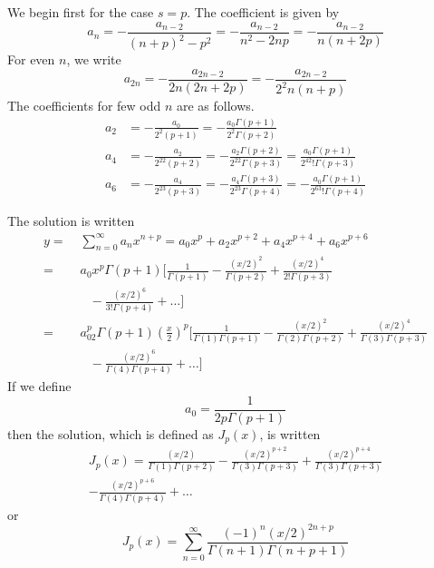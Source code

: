 \documentclass[../main.tex]{subfiles}
\begin{document}
We begin first for the case $s=p$. The coefficient is given by 
\begin{equation*}
    a_n=-\frac{a_{n-2}}{(n+p)^2-p^2}=-\frac{a_{n-2}}{n^2-2np}=-\frac{a_{n-2}}{n(n+2p)}
\end{equation*}
For even $n$, we write
\begin{equation*}
    a_{2n}=-\frac{a_{2n-2}}{2n(2n+2p)}= -\frac{a_{2n-2}}{2^2n(n+p)}
\end{equation*}
The coefficients for few odd $n$ are as follows.
\begin{align*}
    a_2&=-\frac{a_0}{2^2(p+1)}=-\frac{a_0\Gamma(p+1)}{2^2\Gamma(p+2)}\\
    a_4&=-\frac{a_2}{2^22(p+2)}=-\frac{a_2\Gamma(p+2)}{2^22\Gamma(p+3)}=\frac{a_0\Gamma(p+1)}{2^42!\Gamma(p+3)}\\
    a_6&=-\frac{a_4}{2^23(p+3)}=-\frac{a_4\Gamma(p+3)}{2^23\Gamma(p+4)}=-\frac{a_0\Gamma(p+1)}{2^63!\Gamma(p+4)}
\end{align*}

The solution is written
\begin{align*}    
    y=&\;\sum_{n=0}^{\infty} a_nx^{n+p}=a_0x^p+a_2x^{p+2}+a_4 x^{p+4}+a_6x^{p+6}\\
    =&\;a_0x^p\Gamma(p+1)\bigg[\frac{1}{\Gamma(p+1)}- \frac{(x/2)^2}{\Gamma(p+2)}+\frac{(x/2)^4}{2!\Gamma(p+3)}\\
    &\quad- \frac{(x/2)^6}{3!\Gamma(p+4)}+\dots\bigg]\\
    =&\;a_02^p\Gamma(p+1)\left(\frac{x}{2}\right)^p\bigg[\frac{1}{\Gamma(1)\Gamma(p+1)}- \frac{(x/2)^2}{\Gamma(2)\Gamma(p+2)}+\frac{(x/2)^4}{\Gamma(3)\Gamma(p+3)}\\
    &\quad- \frac{(x/2)^6}{\Gamma(4)\Gamma(p+4)}+\dots\bigg]
\end{align*}
If we define 
\begin{equation*}
    a_0=\frac{1}{2p\Gamma(p+1)}
\end{equation*}
then the solution, which is defined as $J_p(x)$, is written
\begin{multline*}
    J_p(x)=\frac{(x/2)}{\Gamma(1)\Gamma(p+2)}-\frac{(x/2)^{p+2}}{\Gamma(3)\Gamma(p+3)} +\frac{(x/2)^{p+4}}{\Gamma(3)\Gamma(p+3)} \\
    -\frac{(x/2)^{p+6}}{\Gamma(4)\Gamma(p+4)} +\dots
\end{multline*}
or
\begin{equation*}
    J_p(x)=\sum_{n=0}^{\infty}\frac{(-1)^n(x/2)^{2n+p}}{\Gamma(n+1)\Gamma(n+p+1)}
\end{equation*}
\end{document}
